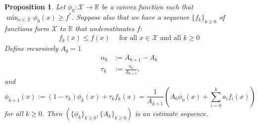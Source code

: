 \documentclass[11pt]{article}
\theoremstyle{plain}
\newtheorem{remark}{Remark}
\newtheorem{proposition}[theorem]{Proposition}
\newcommand{\R}{{\mathbb R}}
\newcommand{\X}{{\mathcal X}}
\begin{document}
\begin{proposition}\cite[2.2]{Baes09}\label{Eq:Prop}
 Let $\phi_0: \X \rightarrow \R$ be a convex function such that $\min_{x \in \X} \phi_0(x)\geq f^\ast$. Suppose also that we have a sequence $\{f_k\}_{k\geq 0}$ of functions form $\X$ to $\R$ that underestimates $f$:
\begin{align}\label{Eq:Under}
f_k(x) \leq f(x) \quad \text{ for all $x \in \X$ and all $k \geq 0$}
\end{align}
Define recursively $A_0 = 1$ 
\begin{align}
\alpha_{k} &:= A_{k+1} - A_k \label{Eq:alpha}\\ 
\tau_k &:= \frac{a_{k}}{A_{k+1}},\label{Eq:tau}
\end{align}
and 
\begin{equation}\label{Eq:Est}
\phi_{k+1}(x) := (1 - \tau_k) \phi_k(x) + \tau_k f_k(x) = \frac{1}{A_{k+1}} \left(A_0\phi_0(x) + \sum_{i=0}^k a_i f_i(x)\right)
\end{equation}
for all $k\geq 0$. Then $\left(\{\phi_k\}_{k\geq0}, \{A_k\}_{k\geq0}\right)$ is an estimate sequence.
\end{proposition}
\end{document}

